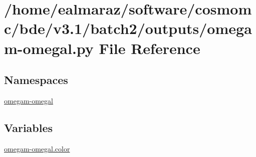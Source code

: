 \hypertarget{batch2_2outputs_2omegam-omegal_8py}{}\section{/home/ealmaraz/software/cosmomc/bde/v3.1/batch2/outputs/omegam-\/omegal.py File Reference}
\label{batch2_2outputs_2omegam-omegal_8py}
\subsection*{Namespaces}
\begin{DoxyCompactItemize}
\item 
 \mbox{\hyperlink{namespaceomegam-omegal}{omegam-\/omegal}}
\end{DoxyCompactItemize}
\subsection*{Variables}
\begin{DoxyCompactItemize}
\item 
\mbox{\hyperlink{namespaceomegam-omegal_aa3a9b83fa0910350b67b8bedcc7d2aec}{omegam-\/omegal.\+color}}
\end{DoxyCompactItemize}
